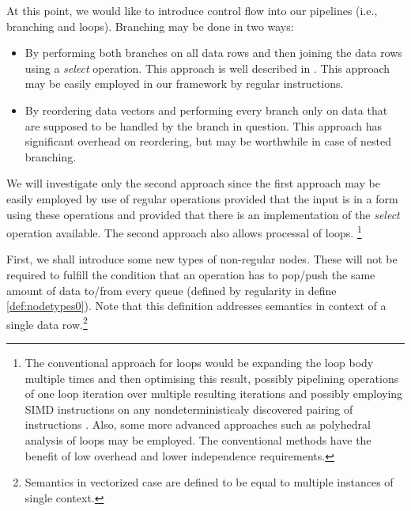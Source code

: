 \label{sec:analysis}

At this point, we would like to introduce control flow into our pipelines (i.e., branching and loops). Branching may be done in two ways:

\label{sec:branching}
\begin{itemize}
  \item By performing both branches on all data rows and then joining the data rows using a \emph{select} operation. This approach is well described in \cite{secondpaper}. This approach may be easily employed in our framework by regular instructions. 
  \item By reordering data vectors and performing every branch only on data that are supposed to be handled by the branch in question. This approach has significant overhead on reordering, but may be worthwhile in case of nested branching.
\end{itemize}

We will investigate only the second approach since the first approach may be easily employed by use of regular operations provided that the input is in a form using these operations and provided that there is an implementation of the \emph{select} operation available. The second approach also allows processal of loops. \footnote{The conventional approach for loops would be expanding the loop body multiple times and then optimising this result, possibly pipelining operations of one loop iteration over multiple resulting iterations and possibly employing SIMD instructions on any nondeterministicaly discovered pairing of instructions \cite{compilers}. Also, some more advanced approaches such as polyhedral analysis of loops may be employed\cite{polyhedral}. The conventional methods have the benefit of low overhead and lower independence requirements. }

\label{sec:node_types}

First, we shall introduce some new types of non-regular nodes. These will not be required to fulfill the condition that an operation has to pop/push the same amount of data to/from every queue (defined by regularity in define \ref{def:nodetypes0}). Note that this definition addresses semantics in context of a single data row.\footnote{Semantics in vectorized case are defined to be equal to multiple instances of single context.}

